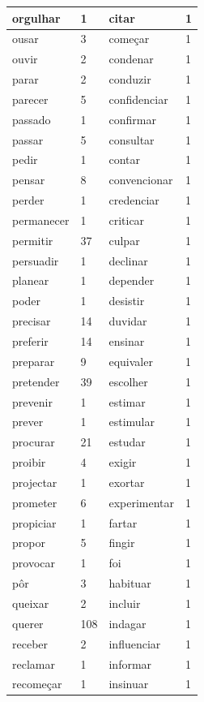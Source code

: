 \documentclass[output=paper,colorlinks,citecolor=brown]{langscibook}
\begin{document}
\begin{longtable}{ p{3cm} | p{1cm} | p{3cm} | p{1cm} }
			orgulhar & 1 & citar & 1\\\hline
			ousar & 3 & começar & 1\\\hline
			ouvir & 2 & condenar & 1\\\hline
			parar & 2 & conduzir & 1\\\hline
			parecer & 5 & confidenciar & 1\\\hline
			passado & 1 & confirmar & 1\\\hline
			passar & 5 & consultar & 1\\\hline
			pedir & 1 & contar & 1\\\hline
			pensar & 8 & convencionar & 1\\\hline
			perder & 1 & credenciar & 1\\\hline
			permanecer & 1 & criticar & 1\\\hline
			permitir & 37 & culpar & 1\\\hline
			persuadir & 1 & declinar & 1\\\hline
			planear & 1 & depender & 1\\\hline
			poder & 1 & desistir & 1\\\hline
			precisar & 14 & duvidar & 1\\\hline
			preferir & 14 & ensinar & 1\\\hline
			preparar & 9 & equivaler & 1\\\hline
			pretender & 39 & escolher & 1\\\hline
			prevenir & 1 & estimar & 1\\\hline
			prever & 1 & estimular & 1\\\hline
			procurar & 21 & estudar & 1\\\hline
			proibir & 4 & exigir & 1\\\hline
			projectar & 1 & exortar & 1\\\hline
			prometer & 6 & experimentar & 1\\\hline
			propiciar & 1 & fartar & 1\\\hline
			propor & 5 & fingir & 1\\\hline
			provocar & 1 & foi & 1\\\hline
			pôr & 3 & habituar & 1\\\hline
			queixar & 2 & incluir & 1\\\hline
			querer & 108 & indagar & 1\\\hline
			receber & 2 & influenciar & 1\\\hline
			reclamar & 1 & informar & 1\\\hline
			recomeçar & 1 & insinuar & 1\\\hline

\end{longtable}
\end{document}
